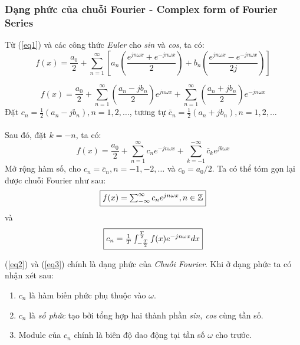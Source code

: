 \documentclass{article}
\begin{document}
        \subsubsection{Dạng phức của chuỗi Fourier - Complex form of Fourier Series}
        Từ (\ref{eq1}) và các công thức \textit{Euler} cho \textit{sin} và \textit{cos}, ta có:
        $$ f(x) = \frac{a_0}{2} + \sum_{n=1}^{\infty} \left[a_n \left(\frac{e^{jn\omega x}+e^{-jn\omega x }}{2} \right) + b_n \left(\frac{e^{jn\omega x}-e^{-jn\omega x }}{2j} \right) \right] $$

        $$ f(x) = \frac{a_0}{2} + \sum_{n=1}^{\infty} \left(\frac{a_n - jb_n}{2}\right)e^{jn\omega x}+\sum_{n=1}^{\infty} \left(\frac{a_n + jb_n}{2}\right)e^{-jn \omega x}$$
        Đặt $c_n = \frac{1}{2} \left(a_n - jb_n \right), n = 1, 2, \ldots$, tương tự $\bar{c}_n = \frac{1}{2} \left(a_n + jb_n \right), n = 1, 2, \ldots$\\ \\
        Sau đó, đặt $k = -n$, ta có:
        $$f(x) = \frac{a_0}{2} + \sum_{n=1}^{\infty} {c_n}e^{-jn\omega x}+\sum_{k=-1}^{-\infty} {\bar{c}_k}e^{jk \omega x}$$
        Mở rộng hàm số, cho $c_n = \bar{c}_n , n = -1, -2, \ldots$ và $c_0 = a_0/2$. Ta có thể tóm gọn lại được chuỗi Fourier như sau:
        \begin{equation}
            \fbox{$f(x) = \sum_{-\infty}^{\infty} c_n e^{jn\omega x}, n \in \mathbb{Z}$}
        \label{eq2}
        \end{equation}
        và 
        \begin{equation}
            \fbox{$c_n = \frac{1}{T} \int_{-\frac{T}{2}}^{\frac{T}{2}} f(x) e^{-jn\omega x} dx$}
            \label{eq3}
        \end{equation}

        (\ref{eq2}) và (\ref{eq3}) chính là dạng phức của \textit{Chuỗi Fourier}. Khi ở dạng phức ta có nhận xét sau:
        \begin{enumerate}
            \item $c_n$ là hàm biến phức phụ thuộc vào $\omega$.
            \item $c_n$ là \textit{số phức} tạo bởi tổng hợp hai thành phần \textit{sin, cos} cùng tần số. 
            \item Module của $c_n$ chính là biên độ dao động tại tần số $\omega$ cho trước.
        \end{enumerate}
\end{document}
